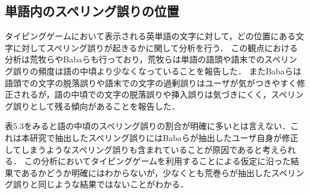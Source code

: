 \subsection{単語内のスペリング誤りの位置}
タイピングゲームにおいて表示される英単語の文字に対して，どの位置にある文字に対してスペリング誤りが起きるかに関して分析を行う．
この観点における分析は荒牧ら\cite{aramakiNLP2010}やBabaら\cite{babaACL2012}も行っており，荒牧らは単語の語頭や語末でのスペリング誤りの頻度は語の中頃より少なくなっていることを報告した．
またBabaらは語頭での文字の脱落誤りや語末での文字の過剰誤りはユーザが気がつきやすく修正されるが，語の中頃での文字の脱落誤りや挿入誤りは気づきにくく，スペリング誤りとして残る傾向があることを報告した．

表5.3をみると語の中頃のスペリング誤りの割合が明確に多いとは言えない．これは本研究で抽出したスペリング誤りにはBabaらが抽出したユーザ自身が修正してしまうようなスペリング誤り\cite{babaACL2012}も含まれていることが原因であると考えられる．
この分析においてタイピングゲームを利用することによる仮定に沿った結果であるかどうか明確にはわからないが，少なくとも荒巻らが抽出したスペリング誤り\cite{aramakiNLP2010}と同じような結果ではないことがわかる．

\begin{comment}
表5.4には英単語の長さに応じた単語内のスペリング誤りの位置の割合を示している．表5.4から英単語の長さが長くなるに応じて語頭と語尾の文字に対するスペリング誤りの割合が減っていることがわかる．
\end{comment}

\begin{comment}
\subsubsection{スペリング誤りの割合}
表7にそれぞれの観点での分析におけるスペリング誤りの割合を示す．この結果からタイピングゲームのような通常より素早くタイピングを行ったり，文字を書き写すような状況ではキーボードのキー配置が近いことが原因で起きる打鍵誤りや入力すべき文字を飛ばしてしまう誤りが起きることがわかった．また単語の語頭や語末でのスペリング誤りの割合は表7に示す．
\end{comment}

\begin{comment}
\subsubsection{同じ文字が連続している文字列に対するスペリング誤り}
\end{comment}


